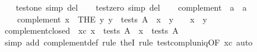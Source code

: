 \begin{isabellebody}
\ \ \isamarkupfalse%
\ test{}one\ {}simp\ del{}\isanewline
\ \ \isamarkupfalse%
\ test{}zero\ {}simp\ del{}\isanewline
\isanewline
\ \ \isamarkupfalse%
\ complement\ {}{}\ {}{}a\ {}\ {}a{}\ {}{}{}{}{}\ \isanewline
\ \ \ \ {}complement\ x\ {}\ {}THE\ y{}\ y\ {}\ tests\ A\ {}\ x\ {}\ y\ {}\ {}\ {}\ x\ {}\ y\ {}\ {}{}{}\isanewline
\isanewline
\ \ \isamarkupfalse%
\ complement{}closed{}\ \ xc{}\ {}x\ {}\ tests\ A{}\ \ {}{}x\ {}\ tests\ A{}\isanewline
%
\isadelimproof
\ \ \ \ %
\endisadelimproof
%
\isatagproof
{}\isamarkupfalse%
\ {}simp\ add{}\ complement{}def{}\ rule\ the{}I{}{}\ rule\ test{}compl{}uniq{}OF\ xc{}{}\ auto{}%

\end{isabellebody}

